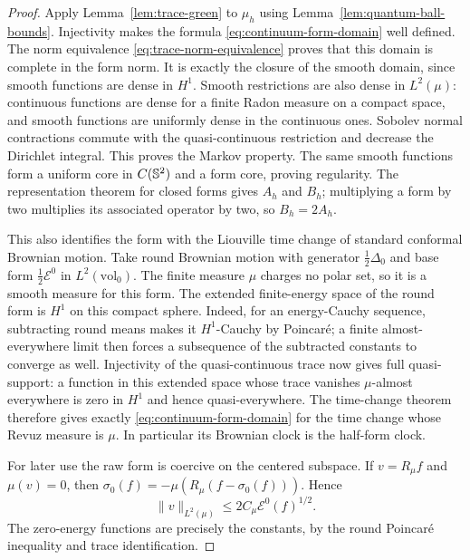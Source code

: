 \begin{proof}
Apply Lemma~\ref{lem:trace-green} to $\mu_h$ using
Lemma~\ref{lem:quantum-ball-bounds}.  Injectivity makes the formula
\eqref{eq:continuum-form-domain} well defined.  The norm equivalence
\eqref{eq:trace-norm-equivalence} proves that this domain is complete in
the form norm.  It is exactly the closure of the smooth domain, since
smooth functions are dense in $H^1$.  Smooth restrictions are also dense
in $L^2(\mu)$: continuous functions are dense for a finite Radon measure
on a compact space, and smooth functions are uniformly dense in the
continuous ones.  Sobolev normal contractions commute with the
quasi-continuous restriction and decrease the Dirichlet integral.  This
proves the Markov property.  The same smooth functions form a uniform
core in $C(\mathbb S^2)$ and a form core, proving regularity.  The representation
theorem for closed forms gives $A_h$ and $B_h$; multiplying a form by
two multiplies its associated operator by two, so $B_h=2A_h$.

This also identifies the form with the Liouville time change of standard
conformal Brownian motion.  Take round Brownian motion with generator
$\frac12\Delta_0$ and base form $\frac12\mathcal E^0$ in
$L^2(\mathrm{vol}_0)$.  The finite measure $\mu$ charges no polar set,
so it is a smooth measure for this form.  The extended finite-energy space
of the round form is $H^1$ on this compact sphere.  Indeed, for an energy-Cauchy sequence,
subtracting round means makes it $H^1$-Cauchy by Poincar\'e; a finite
almost-everywhere limit then forces a subsequence of the subtracted
constants to converge as well.  Injectivity of the quasi-continuous trace
now gives full quasi-support: a function in this extended space whose
trace vanishes $\mu$-almost everywhere is zero in $H^1$ and hence
quasi-everywhere.  The time-change theorem
\cite[Theorem~6.2.1]{FukushimaOshimaTakeda2011} therefore gives exactly
\eqref{eq:continuum-form-domain} for the time change whose Revuz measure
is $\mu$.  In particular its Brownian clock is the half-form clock.

For later use the raw form is coercive on the centered subspace.  If
$v=R_\mu f$ and $\mu(v)=0$, then
$\sigma_0(f)=-\mu(R_\mu(f-\sigma_0(f)))$.  Hence
\begin{equation}\label{eq:continuum-centered-poincare}
 \|v\|_{L^2(\mu)}\le 2C_\mu\mathcal E^0(f)^{1/2}.
\end{equation}
The zero-energy functions are precisely the constants, by the round
Poincar\'e inequality and trace identification.


\end{proof}

